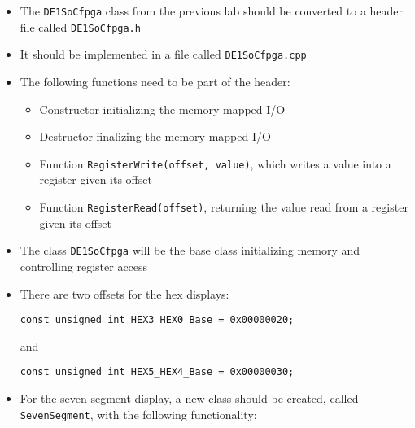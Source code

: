 \begin{itemize}
  \item The \texttt{DE1SoCfpga} class from the previous lab should be converted to a header file called \texttt{DE1SoCfpga.h}

  \item It should be implemented in a file called \texttt{DE1SoCfpga.cpp}

  \item The following functions need to be part of the header:

    \begin{itemize}

      \item Constructor initializing the memory-mapped I/O

      \item Destructor finalizing the memory-mapped I/O

      \item Function \texttt{RegisterWrite(offset, value)}, which writes a value into a register given its offset

      \item Function \texttt{RegisterRead(offset)}, returning the value read from a register given its offset

    \end{itemize}

  \item The class \texttt{DE1SoCfpga} will be the base class initializing memory and controlling register access

  \item There are two offsets for the hex displays:

    \begin{center}
      \texttt{const unsigned int HEX3\_HEX0\_Base = 0x00000020;}
    \end{center}

    \begin{center}
      and
    \end{center}

    \begin{center}
      \texttt{const unsigned int HEX5\_HEX4\_Base = 0x00000030;}
    \end{center}

  \item For the seven segment display, a new class should be created, called \texttt{SevenSegment}, with the following functionality:

    \begin{itemize}


\end{itemize}
\end{itemize}
